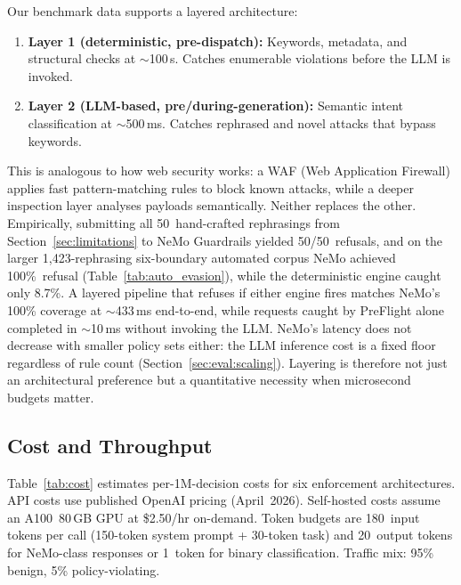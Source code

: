 \documentclass[11pt,a4paper]{article}
\begin{document}
Our benchmark data supports a layered architecture:

\begin{enumerate}[nosep]
  \item \textbf{Layer 1 (deterministic, pre-dispatch):} Keywords, metadata,
    and structural checks at $\sim$100\,\textmu s. Catches enumerable
    violations before the LLM is invoked.
  \item \textbf{Layer 2 (LLM-based, pre/during-generation):} Semantic
    intent classification at $\sim$500\,ms. Catches rephrased and novel
    attacks that bypass keywords.
\end{enumerate}

This is analogous to how web security works: a WAF (Web Application
Firewall) applies fast pattern-matching rules to block known attacks,
while a deeper inspection layer analyses payloads semantically. Neither
replaces the other.  Empirically, submitting all 50~hand-crafted
rephrasings from Section~\ref{sec:limitations} to NeMo Guardrails
yielded 50/50~refusals, and on the larger 1{,}423-rephrasing
six-boundary automated corpus NeMo achieved 100\%~refusal
(Table~\ref{tab:auto_evasion}), while the deterministic engine caught
only 8.7\%.  A layered pipeline that refuses if either engine fires
matches NeMo's 100\% coverage at $\sim$433\,ms end-to-end, while
requests caught by PreFlight alone completed
in $\sim$10\,ms without invoking the LLM.  NeMo's
latency does not decrease with
smaller policy sets either: the LLM inference cost is a fixed floor
regardless of rule count (Section~\ref{sec:eval:scaling}). Layering is
therefore not just an architectural preference but a quantitative
necessity when microsecond budgets matter.

\subsection{Cost and Throughput}
\label{sec:cost}

Table~\ref{tab:cost} estimates per-1M-decision costs for six
enforcement architectures. API costs use published OpenAI pricing
(April~2026). Self-hosted costs assume an A100~80\,GB GPU at
\$2.50/hr on-demand. Token budgets are 180~input tokens per call
(150-token system prompt + 30-token task) and 20~output tokens for
NeMo-class responses or 1~token for binary classification. Traffic
mix: 95\% benign, 5\% policy-violating.
\end{document}
